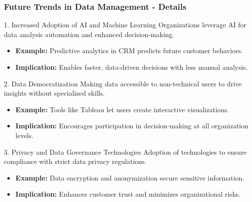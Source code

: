 \documentclass[aspectratio=169]{beamer}
\begin{document}
\begin{frame}[fragile]
    \frametitle{Future Trends in Data Management - Details}
    \begin{block}{1. Increased Adoption of AI and Machine Learning}
        Organizations leverage AI for data analysis automation and enhanced decision-making.
        \begin{itemize}
            \item \textbf{Example:} Predictive analytics in CRM predicts future customer behaviors.
            \item \textbf{Implication:} Enables faster, data-driven decisions with less manual analysis.
        \end{itemize}
    \end{block}
    
    \begin{block}{2. Data Democratization}
        Making data accessible to non-technical users to drive insights without specialized skills.
        \begin{itemize}
            \item \textbf{Example:} Tools like Tableau let users create interactive visualizations.
            \item \textbf{Implication:} Encourages participation in decision-making at all organization levels.
        \end{itemize}
    \end{block}
    
    \begin{block}{3. Privacy and Data Governance Technologies}
        Adoption of technologies to ensure compliance with strict data privacy regulations.
        \begin{itemize}
            \item \textbf{Example:} Data encryption and anonymization secure sensitive information.
            \item \textbf{Implication:} Enhances customer trust and minimizes organizational risks.
        \end{itemize}
    \end{block}
\end{frame}
\end{document}
